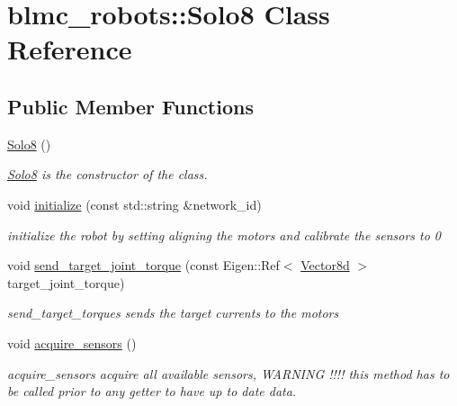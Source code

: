 \hypertarget{classblmc__robots_1_1Solo8}{}\section{blmc\+\_\+robots\+:\+:Solo8 Class Reference}
\label{classblmc__robots_1_1Solo8}
\subsection*{Public Member Functions}
\begin{DoxyCompactItemize}
\item 
\hyperlink{classblmc__robots_1_1Solo8_ab37c2e406f12685fcb4e09086ee7c0c0}{Solo8} ()
\begin{DoxyCompactList}\small\item\em \hyperlink{classblmc__robots_1_1Solo8}{Solo8} is the constructor of the class. \end{DoxyCompactList}\item 
\mbox{\label{classblmc__robots_1_1Solo8_a7016486ea321d63f2659b5efba4dd78a}} 
void \hyperlink{classblmc__robots_1_1Solo8_a7016486ea321d63f2659b5efba4dd78a}{initialize} (const std\+::string \&network\+\_\+id)
\begin{DoxyCompactList}\small\item\em initialize the robot by setting aligning the motors and calibrate the sensors to 0 \end{DoxyCompactList}\item 
\mbox{\label{classblmc__robots_1_1Solo8_aa743eac2996bd33c86e23bd2029c3a01}} 
void \hyperlink{classblmc__robots_1_1Solo8_aa743eac2996bd33c86e23bd2029c3a01}{send\+\_\+target\+\_\+joint\+\_\+torque} (const Eigen\+::\+Ref$<$ \hyperlink{common__header_8hpp_a98975ffbe0bca1296078e0350dfedd60}{Vector8d} $>$ target\+\_\+joint\+\_\+torque)
\begin{DoxyCompactList}\small\item\em send\+\_\+target\+\_\+torques sends the target currents to the motors \end{DoxyCompactList}\item 
void \hyperlink{classblmc__robots_1_1Solo8_a2ba66edbb1dc4b9fddb9e9978f0fd9e7}{acquire\+\_\+sensors} ()
\begin{DoxyCompactList}\small\item\em acquire\+\_\+sensors acquire all available sensors, W\+A\+R\+N\+I\+NG !!!! this method has to be called prior to any getter to have up to date data. \end{DoxyCompactList}\item 

\end{DoxyCompactItemize}
